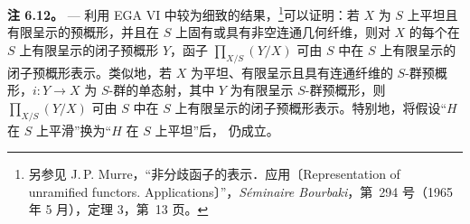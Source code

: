 \medskip\noindent{}\textbf{注 6.12。} --- 利用 EGA VI 中较为细致的结果，\footnote{另参见 J.\,P. Murre，“非分歧函子的表示．应用〔Representation of unramified functors. Applications〕”，\emph{Séminaire Bourbaki}，第\ 294 号（1965 年 5 月），定理 3，第\ 13 页。}可以证明：若 \(X\) 为 \(S\) 上平坦且有限呈示的预概形，并且在 \(S\) 上固有或具有非空连通几何纤维，则对 \(X\) 的每个在 \(S\) 上有限呈示的闭子预概形 \(Y\)，函子 \(\prod_{X/S}(Y/X)\) 可由 \(S\) 中在 \(S\) 上有限呈示的闭子预概形表示。类似地，若 \(X\) 为平坦、有限呈示且具有连通纤维的 \(S\)-群预概形，\(i:Y\to X\) 为 \(S\)-群的单态射，其中 \(Y\) 为有限呈示 \(S\)-群预概形，则 \(\prod_{X/S}(Y/X)\) 可由 \(S\) 中在 \(S\) 上有限呈示的闭子预概形表示。特别地，将假设“\(H\) 在 \(S\) 上平滑”换为“\(H\) 在 \(S\) 上平坦”后， 仍成立。


